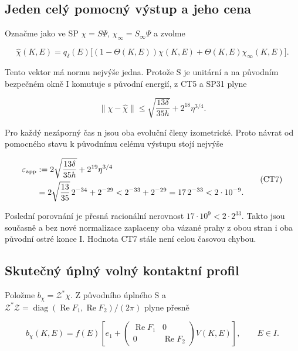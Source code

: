 \documentclass[11pt,a4paper]{article}
\theoremstyle{remark}\newtheorem{remark}[theorem]{Poznámka}
\numberwithin{equation}{section}
\begin{document}
\hypertarget{jeden-celuxfd-pomocnuxfd-vuxfdstup-a-jeho-cena}{%
\subsection{Jeden celý pomocný výstup a jeho
cena}\label{jeden-celuxfd-pomocnuxfd-vuxfdstup-a-jeho-cena}}

Označme jako ve SP \(\chi=S\Psi\), \(\chi_\infty=S_\infty\Psi\) a zvolme

\[
\widehat\chi(K,E)=q_\delta(E)
\bigl[(1-\Theta(K,E))\chi(K,E)
 +\Theta(K,E)\chi_\infty(K,E)\bigr].
\tag{CT6}
\]

Tento vektor má normu nejvýše jedna. Protože S je unitární a na původním
bezpečném okně I komutuje s původní energií, z CT5 a SP31 plyne

\[
\|\chi-\widehat\chi\|
\le\sqrt{\frac{13\delta}{35h}}+2^{18}\eta^{3/4}.
\]

Pro každý nezáporný čas n jsou oba evoluční členy izometrické. Proto
návrat od pomocného stavu k původnímu celému výstupu stojí nejvýše

\[
\begin{aligned}
\varepsilon_{\rm app}
&:=2\sqrt{\frac{13\delta}{35h}}+2^{19}\eta^{3/4}\\
&=2\sqrt{\frac{13}{35}}\,2^{-34}+2^{-29}
<2^{-33}+2^{-29}=17\,2^{-33}<2\cdot10^{-9}.
\end{aligned}
\tag{CT7}
\]

Poslední porovnání je přesná racionální nerovnost
\(17\cdot10^9<2\cdot2^{33}\). Takto jsou současně a bez nové normalizace
zaplaceny oba vázané prahy z obou stran i oba původní ostré konce I.
Hodnota CT7 stále není celou časovou chybou.

\hypertarget{skuteux10dnuxfd-uxfaplnuxfd-volnuxfd-kontaktnuxed-profil}{%
\subsection{Skutečný úplný volný kontaktní
profil}\label{skuteux10dnuxfd-uxfaplnuxfd-volnuxfd-kontaktnuxed-profil}}

Položme \(b_\chi=\mathcal Z^*\chi\). Z původního úplného S a
\(\mathcal Z^*\mathcal Z =\operatorname{diag}(\operatorname{Re}F_1,\operatorname{Re}F_2)/(2\pi)\)
plyne přesně

\[
b_\chi(K,E)=f(E)
\left[e_1+
\begin{pmatrix}\operatorname{Re}F_1&0\\0&\operatorname{Re}F_2\end{pmatrix}
V(K,E)\right],\qquad E\in I.
\tag{CT8}
\]
\end{document}
